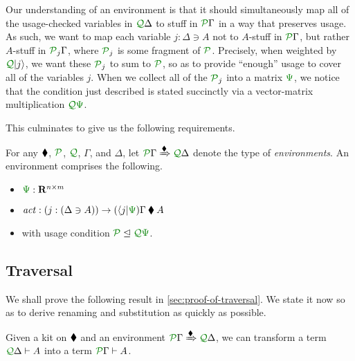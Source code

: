 \documentclass[submission,copyright,creativecommons]{eptcs}
\begin{document}
Our understanding of an environment is that it should simultaneously map all of
the usage-checked variables in $\ctx{\Delta}{Q}$ to stuff in $\ctx{\Gamma}{P}$
in a way that preserves usage.
As such, we want to map each variable $j : \Delta \ni A$ not to $A$-stuff in
$\ctx{\Gamma}{P}$, but rather $A$-stuff in $\resctx P_j\Gamma$,
where $\resctx P_j$ is some fragment of $\resctx P$.
Precisely, when weighted by $\resctx Q\lvert j \rangle$, we want these
$\resctx P_j$ to sum to $\resctx P$, so as to provide ``enough'' usage to cover
all of the variables $j$.
When we collect all of the $\resctx P_j$ into a matrix $\rescomment\Psi$, we
notice that the condition just described is stated succinctly via a
vector-matrix multiplication $\resctx Q\rescomment\Psi$.

This culminates to give us the following requirements.

\begin{definition}\label{def:env}
  For any $\mathbin{\blacklozenge}$, $\resctx P$, $\resctx Q$, $\Gamma$, and $\Delta$, let
  $\ctx{\Gamma}{P} \subst{\kitrel} \ctx{\Delta}{Q}$ denote the type of
  \emph{environments}.
  An environment comprises the following.
\begin{itemize}
  \item $\rescomment\Psi : \mathbf R^{n \times m}$
  \item $\mathit{act} :
    (j : (\Delta \ni A)) \to (\langle j \rvert\rescomment\Psi)\Gamma \kitrel A$
  \item with usage condition $\resctx P \subres \resctx Q \rescomment\Psi$.
\end{itemize}
\end{definition}

\subsection{Traversal}

We shall prove the following result in \autoref{sec:proof-of-traversal}.
We state it now so as to derive renaming and substitution as quickly as
possible.

\newcommand{\thmtrav}{%
  Given a kit on $\kitrel$ and an environment
  $\ctx{\Gamma}{P} \subst{\kitrel} \ctx{\Delta}{Q}$, we can transform a term
  $\ctx{\Delta}{Q} \vdash A$ into a term $\ctx{\Gamma}{P} \vdash A$.%
}
\begin{theorem}\label{thm:trav}
  \thmtrav
\end{theorem}
\end{document}
